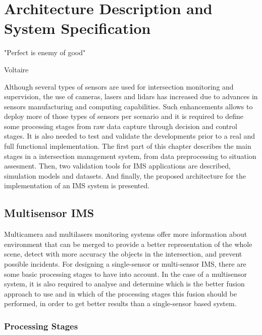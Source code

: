 
\chapter [Architecture Description and System Specification]{Architecture Description and System Specification}

\epigraph{"Perfect is enemy of good"}{Voltaire}

Although several types of sensors are used for intersection monitoring and supervision, the use of cameras, lasers and lidars has increased due to advances in sensors manufacturing and computing capabilities. Such enhancements allows to deploy more of those types of sensors per scenario and it is required to define some processing stages from raw data capture through decision and control stages. It is also needed to test and validate the developments prior to a real and full functional implementation. The first part of this chapter describes the main stages in a intersection management system, from data preprocessing to situation assesment. Then, two validation tools for IMS applications are described, simulation models and datasets. And finally, the proposed architecture for the implementation of an IMS system is presented.

\section{Multisensor IMS}

Multicamera and multilasers monitoring systems offer more information about environment that can be merged to provide a better representation of the whole scene, detect with more accuracy the objects in the intersection, and prevent possible incidents. For designing a single-sensor or multi-sensor IMS, there are some basic processing stages to have into account. In the case of a multisensor system, it is also required to analyse and determine which is the better fusion approach to use and in which of the processing stages this fusion should be performed, in order to get better results than a single-sensor based system.

\subsection{Processing Stages}

